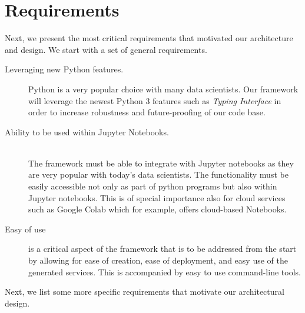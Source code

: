 \section{Requirements}
\label{sec:requirements}

Next, we present the most critical requirements that motivated our architecture and design. We start with a set of general requirements.

\begin{description}

\item[Leveraging new Python features.] Python is a very popular choice with many data scientists. Our framework will leverage the newest Python 3 features such as {\em Typing Interface} \cite{www-python-typing} in order to increase robustness and future-proofing of our code base. 

\item[Ability to be used within Jupyter Notebooks.] ~\\
The framework must be able to integrate with Jupyter notebooks as they are very popular with today's data scientists. The functionality must be easily accessible not only as part of python programs but also within Jupyter notebooks. This is of special importance also for cloud services such as Google Colab \cite{google-colab} which for example, offers cloud-based Notebooks. 

\item[Easy of use] is a critical aspect of the framework that is to be addressed from the start by allowing for ease of creation, ease of deployment, and easy use of the generated services. This is accompanied by easy to use command-line tools.

\end{description}

Next, we list some more specific requirements that motivate our architectural design.

